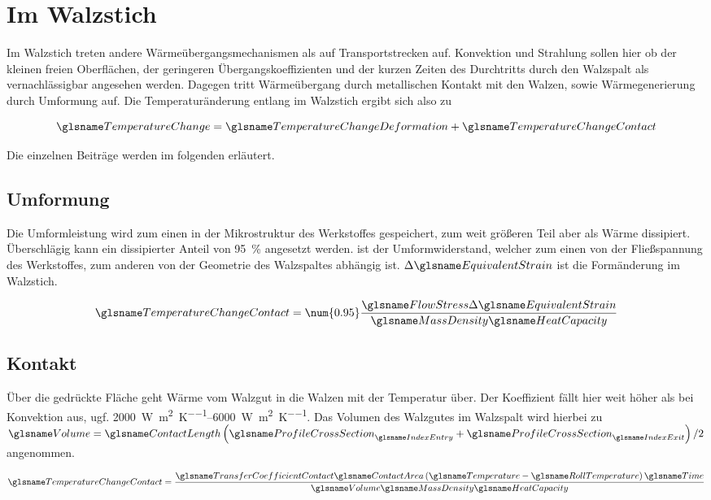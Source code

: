 \section{Im Walzstich}\label{sec:im-walzstich}

Im Walzstich treten andere Wärmeübergangsmechanismen als auf Transportstrecken auf.
Konvektion und Strahlung sollen hier ob der kleinen freien Oberflächen, der geringeren Übergangskoeffizienten und der kurzen Zeiten des Durchtritts durch den Walzspalt als vernachlässigbar angesehen werden.
Dagegen tritt Wärmeübergang durch metallischen Kontakt mit den Walzen, sowie Wärmegenerierung durch Umformung auf.
Die Temperaturänderung entlang im Walzstich ergibt sich also zu

\begin{equation}
    \TemperatureChange = \TemperatureChangeDeformation + \TemperatureChangeContact
    \label{eq:DeltaT-stich}
\end{equation}

Die einzelnen Beiträge werden im folgenden erläutert.

\subsection{Umformung}\label{subsec:im-walzstich-umformung}

Die Umformleistung wird zum einen in der Mikrostruktur des Werkstoffes gespeichert, zum weit größeren Teil aber als Wärme dissipiert.
Überschlägig kann ein dissipierter Anteil von \SI{95}{\percent} angesetzt werden.
\FlowStress ist der Umformwiderstand, welcher zum einen von der Fließspannung des Werkstoffes, zum anderen von der Geometrie des Walzspaltes abhängig ist.
$\Delta\EquivalentStrain$ ist die Formänderung im Walzstich.

\begin{equation}
    \TemperatureChangeContact = \num{0.95} \frac{\FlowStress \Delta\EquivalentStrain}{\MassDensity \HeatCapacity}
    \label{eq:DeltaTU}
\end{equation}

\subsection{Kontakt}\label{subsec:im-walzstich-kontakt}

Über die gedrückte Fläche \ContactArea geht Wärme vom Walzgut in die Walzen mit der Temperatur \RollTemperature über.
Der Koeffizient \TransferCoefficientContact fällt hier weit höher als bei Konvektion aus, ugf. \SIrange{2000}{6000}{\watt\per\square\meter\per\kelvin}.
Das Volumen des Walzgutes im Walzspalt wird hierbei zu $\Volume = \ContactLength \left( \ProfileCrossSection_\IndexEntry + \ProfileCrossSection_\IndexExit \right) / 2$ angenommen.

\begin{equation}
    \TemperatureChangeContact = \frac{\TransferCoefficientContact \ContactArea \left( \Temperature - \RollTemperature \right) \Time}{\Volume \MassDensity \HeatCapacity}
    \label{eq:DeltaTC}
\end{equation}